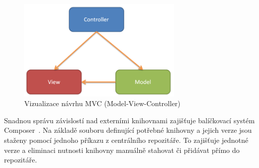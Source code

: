 \documentclass[thesis=B,czech]{FITthesis}[2012/06/26]
\begin{document}
\begin{figure}[h]\centering
 	\includegraphics[width=0.7\textwidth]{resources/mvc}
	\caption[MVC]{Vizualizace návrhu MVC (Model-View-Controller)}\label{fig:mvc}
\end{figure}
\par
Snadnou správu závislostí nad externími knihovnami zajišťuje balíčkovací systém Composer~\cite{composer}. 
Na základě souboru definující potřebné knihovny a jejich verze jsou staženy pomocí jednoho příkazu z centrálního repozitáře. To zajišťuje jednotné verze
a eliminaci nutnosti knihovny manuálně stahovat či přidávat přímo do repozitáře.
\end{document}
